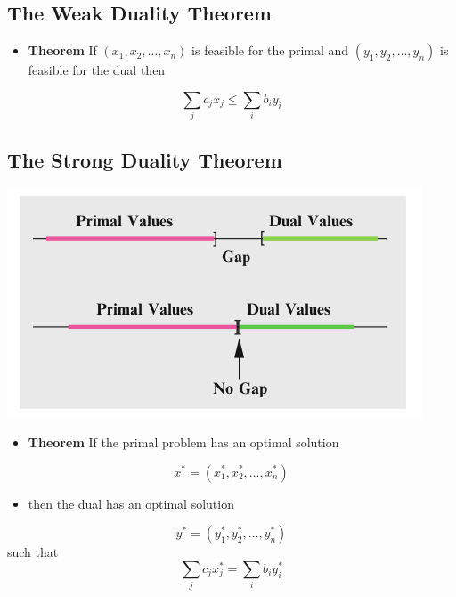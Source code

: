 \documentclass[11pt]{article}
\begin{document}
\subsection{The Weak Duality Theorem}
\label{sec:org97cb2fa}
\begin{itemize}
\item \textbf{Theorem} If \((x_1, x_2, \dots, x_n)\) is feasible for the primal and \((y_1, y_2, \dots, y_n)\) is feasible for the dual then
\end{itemize}
\begin{equation}
  \sum_j c_jx_j \leq \sum_i b_iy_i 
\end{equation}

\subsection{The Strong Duality Theorem}
\label{sec:org9e85167}
\begin{center}
\includegraphics[width=.9\linewidth]{Duality Theory/screenshot_2019-02-06_11-12-19.png}
\end{center} 

\begin{itemize}
\item \textbf{Theorem} If the primal problem has an optimal solution
\end{itemize}
\begin{equation}
  x^*= (x_1^*, x_2^*, \dots, x_n^*)
\end{equation}	
\begin{itemize}
\item then the dual has an optimal solution
\end{itemize}
\begin{equation}
  y^*= (y_1^*, y_2^*, \dots, y_n^*)
\end{equation}	
such that	
\begin{equation}
  \sum_j c_j x_j^* = \sum_i b_i y_i^*
\end{equation}	
\end{document}
